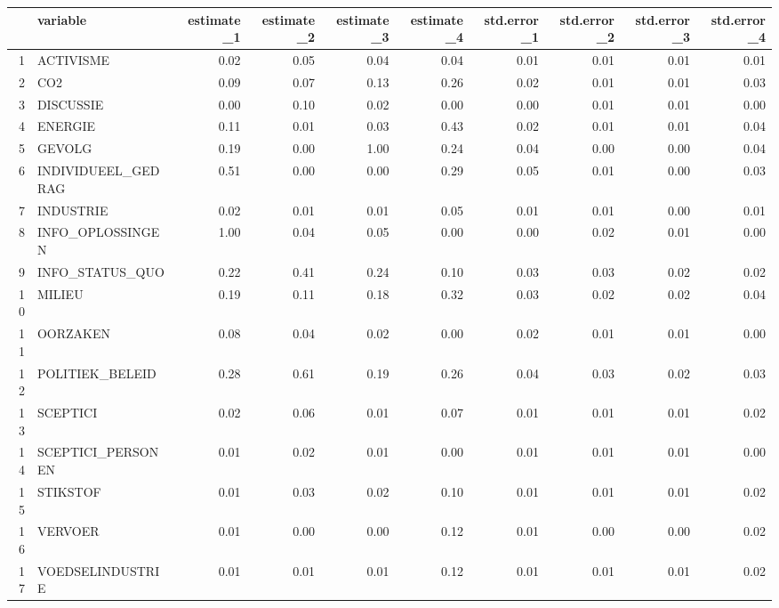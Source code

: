 \begin{table}[ht]
\centering
\begin{tabular}{rlrrrrrrrr}
  \hline
 & variable & estimate\_1 & estimate\_2 & estimate\_3 & estimate\_4 & std.error\_1 & std.error\_2 & std.error\_3 & std.error\_4 \\ 
  \hline
1 & ACTIVISME & 0.02 & 0.05 & 0.04 & 0.04 & 0.01 & 0.01 & 0.01 & 0.01 \\ 
  2 & CO2 & 0.09 & 0.07 & 0.13 & 0.26 & 0.02 & 0.01 & 0.01 & 0.03 \\ 
  3 & DISCUSSIE & 0.00 & 0.10 & 0.02 & 0.00 & 0.00 & 0.01 & 0.01 & 0.00 \\ 
  4 & ENERGIE & 0.11 & 0.01 & 0.03 & 0.43 & 0.02 & 0.01 & 0.01 & 0.04 \\ 
  5 & GEVOLG & 0.19 & 0.00 & 1.00 & 0.24 & 0.04 & 0.00 & 0.00 & 0.04 \\ 
  6 & INDIVIDUEEL\_GEDRAG & 0.51 & 0.00 & 0.00 & 0.29 & 0.05 & 0.01 & 0.00 & 0.03 \\ 
  7 & INDUSTRIE & 0.02 & 0.01 & 0.01 & 0.05 & 0.01 & 0.01 & 0.00 & 0.01 \\ 
  8 & INFO\_OPLOSSINGEN & 1.00 & 0.04 & 0.05 & 0.00 & 0.00 & 0.02 & 0.01 & 0.00 \\ 
  9 & INFO\_STATUS\_QUO & 0.22 & 0.41 & 0.24 & 0.10 & 0.03 & 0.03 & 0.02 & 0.02 \\ 
  10 & MILIEU & 0.19 & 0.11 & 0.18 & 0.32 & 0.03 & 0.02 & 0.02 & 0.04 \\ 
  11 & OORZAKEN & 0.08 & 0.04 & 0.02 & 0.00 & 0.02 & 0.01 & 0.01 & 0.00 \\ 
  12 & POLITIEK\_BELEID & 0.28 & 0.61 & 0.19 & 0.26 & 0.04 & 0.03 & 0.02 & 0.03 \\ 
  13 & SCEPTICI & 0.02 & 0.06 & 0.01 & 0.07 & 0.01 & 0.01 & 0.01 & 0.02 \\ 
  14 & SCEPTICI\_PERSONEN & 0.01 & 0.02 & 0.01 & 0.00 & 0.01 & 0.01 & 0.01 & 0.00 \\ 
  15 & STIKSTOF & 0.01 & 0.03 & 0.02 & 0.10 & 0.01 & 0.01 & 0.01 & 0.02 \\ 
  16 & VERVOER & 0.01 & 0.00 & 0.00 & 0.12 & 0.01 & 0.00 & 0.00 & 0.02 \\ 
  17 & VOEDSELINDUSTRIE & 0.01 & 0.01 & 0.01 & 0.12 & 0.01 & 0.01 & 0.01 & 0.02 \\ 
   \hline
\end{tabular}
\end{table}
